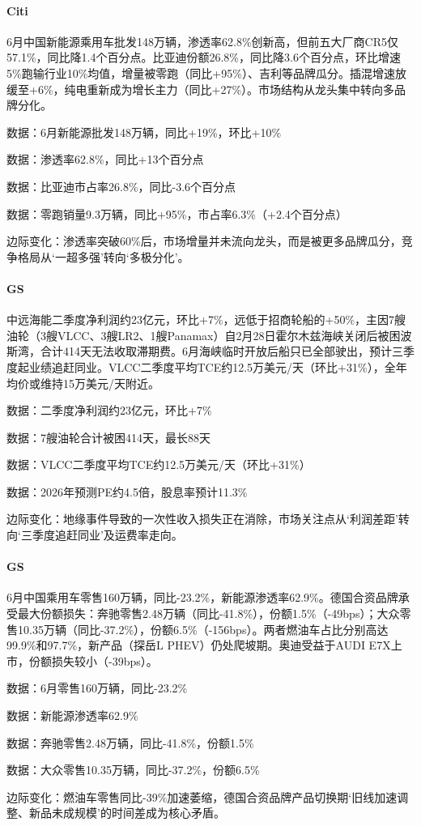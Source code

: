 \documentclass[11pt]{ctexart}
\begin{document}
\paragraph{Citi} 6月中国新能源乘用车批发148万辆，渗透率62.8\%创新高，但前五大厂商CR5仅57.1\%，同比降1.4个百分点。比亚迪份额26.8\%，同比降3.6个百分点，环比增速5\%跑输行业10\%均值，增量被零跑（同比+95\%）、吉利等品牌瓜分。插混增速放缓至+6\%，纯电重新成为增长主力（同比+27\%）。市场结构从龙头集中转向多品牌分化。
{\small\color{refgray}数据：6月新能源批发148万辆，同比+19\%，环比+10\%\par}
{\small\color{refgray}数据：渗透率62.8\%，同比+13个百分点\par}
{\small\color{refgray}数据：比亚迪市占率26.8\%，同比-3.6个百分点\par}
{\small\color{refgray}数据：零跑销量9.3万辆，同比+95\%，市占率6.3\%（+2.4个百分点）\par}
{\small\color{refgray}边际变化：渗透率突破60\%后，市场增量并未流向龙头，而是被更多品牌瓜分，竞争格局从‘一超多强’转向‘多极分化’。\par}
\paragraph{GS} 中远海能二季度净利润约23亿元，环比+7\%，远低于招商轮船的+50\%，主因7艘油轮（3艘VLCC、3艘LR2、1艘Panamax）自2月28日霍尔木兹海峡关闭后被困波斯湾，合计414天无法收取滞期费。6月海峡临时开放后船只已全部驶出，预计三季度起业绩追赶同业。VLCC二季度平均TCE约12.5万美元/天（环比+31\%），全年均价或维持15万美元/天附近。
{\small\color{refgray}数据：二季度净利润约23亿元，环比+7\%\par}
{\small\color{refgray}数据：7艘油轮合计被困414天，最长88天\par}
{\small\color{refgray}数据：VLCC二季度平均TCE约12.5万美元/天（环比+31\%）\par}
{\small\color{refgray}数据：2026年预测PE约4.5倍，股息率预计11.3\%\par}
{\small\color{refgray}边际变化：地缘事件导致的一次性收入损失正在消除，市场关注点从‘利润差距’转向‘三季度追赶同业’及运费率走向。\par}
\paragraph{GS} 6月中国乘用车零售160万辆，同比-23.2\%，新能源渗透率62.9\%。德国合资品牌承受最大份额损失：奔驰零售2.48万辆（同比-41.8\%），份额1.5\%（-49bps）；大众零售10.35万辆（同比-37.2\%），份额6.5\%（-156bps）。两者燃油车占比分别高达99.9\%和97.7\%，新产品（探岳L PHEV）仍处爬坡期。奥迪受益于AUDI E7X上市，份额损失较小（-39bps）。
{\small\color{refgray}数据：6月零售160万辆，同比-23.2\%\par}
{\small\color{refgray}数据：新能源渗透率62.9\%\par}
{\small\color{refgray}数据：奔驰零售2.48万辆，同比-41.8\%，份额1.5\%\par}
{\small\color{refgray}数据：大众零售10.35万辆，同比-37.2\%，份额6.5\%\par}
{\small\color{refgray}边际变化：燃油车零售同比-39\%加速萎缩，德国合资品牌产品切换期‘旧线加速调整、新品未成规模’的时间差成为核心矛盾。\par}
\end{document}
